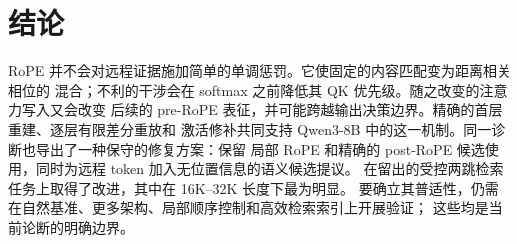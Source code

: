 \section{结论}
\label{sec:conclusion}

RoPE 并不会对远程证据施加简单的单调惩罚。它使固定的内容匹配变为距离相关相位的
混合；不利的干涉会在 softmax 之前降低其 QK 优先级。随之改变的注意力写入又会改变
后续的 pre-RoPE 表征，并可能跨越输出决策边界。精确的首层重建、逐层有限差分重放和
激活修补共同支持 Qwen3-8B 中的这一机制。同一诊断也导出了一种保守的修复方案：保留
局部 RoPE 和精确的 post-RoPE 候选使用，同时为远程 token 加入无位置信息的语义候选提议。
\methodpost 在留出的受控两跳检索任务上取得了改进，其中在 16K--32K 长度下最为明显。
要确立其普适性，仍需在自然基准、更多架构、局部顺序控制和高效检索索引上开展验证；
这些均是当前论断的明确边界。
